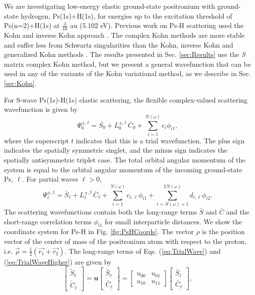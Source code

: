 \documentclass[preprint,showpacs,preprintnumbers,amsmath,amssymb]{revtex4}
\begin{document}
We are investigating low-energy elastic ground-state positronium with ground-state hydrogen, Ps(1s)+H(1s), for energies up to the excitation threshold of Ps(n=2)+H(1s) at $\tfrac{3}{16}$ au ($5.102$ eV). Previous work on Ps-H scattering used the Kohn and inverse Kohn approach \cite{VanReeth2003, VanReeth2004}. The complex Kohn methods are more stable and suffer less from Schwartz singularities than the Kohn, inverse Kohn and generalized Kohn methods \cite{Lucchese1989,Cooper2009,Cooper2010}. The results presented in Sec. \ref{sec:Results} use the \emph{S} matrix complex Kohn method, but we present a general wavefunction that can be used in any of the variants of the Kohn variational method, as we describe in Sec. \ref{sec:Kohn}.

For S-wave Ps(1s)-H(1s) elastic scattering, the flexible complex-valued scattering wavefunction is given by
\begin{equation}
\Psi_0^{\pm,t} = \bar{S_0} + L_0^{\pm,t} \, \bar{C}_0 + \sum_{i=1}^{N(\omega)} c_i \phi_{i1},
\label{eq:TrialWave}
\end{equation}
where the superscript $t$ indicates that this is a trial wavefunction. The plus sign indicates the spatially symmetric singlet, and the minus sign indicates the spatially antisymmetric triplet case. The total orbital angular momentum of the system is equal to the orbital angular momentum of the incoming ground-state Ps, $\ell$. For partial waves $\ell > 0$,
\begin{equation}
\Psi_\ell^{\pm,t} = \bar{S}_\ell + L^{\pm,t}_\ell \, \bar{C}_\ell + \sum_{i=1}^{N(\omega)} c_{i,\ell} \phi_{i1} + \!\!\!\sum_{i=N(\omega)+1}^{2N(\omega)} \!\! d_{i,\ell} \phi_{i2}.
\label{eq:TrialWaveHigher}
\end{equation}
The scattering wavefunctions contain both the long-range terms $\bar{S}$ and $\bar{C}$ and the short-range correlation terms $\phi_{i1}$ for small interparticle distances. We show the coordinate system for Ps-H in Fig. \ref{fig:PsHCoords}. The vector $\rho$ is the position vector of the center of mass of the positronium atom with respect to the proton, i.e. $\vec{\rho} = \frac{1}{2}\left(\vec{r_1} + \vec{r_2}\right)$. The long-range terms of Eqs. (\ref{eq:TrialWave}) and (\ref{eq:TrialWaveHigher}) are given by
\begin{equation}
\label{eq:SCPhiDef}
\begin{bmatrix}
\widetilde{S}_\ell \\ \widetilde{C}_\ell
\end{bmatrix} = \textbf{u}  \begin{bmatrix}
\bar{S}_\ell \\ \bar{C}_\ell
\end{bmatrix} = \begin{bmatrix}
u_{00} & u_{01} \\  u_{10} & u_{11}
\end{bmatrix}
\begin{bmatrix}
\bar{S}_\ell \\ \bar{C}_\ell
\end{bmatrix}, 
\end{equation}
\end{document}
